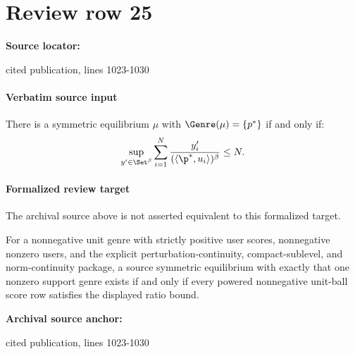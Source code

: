 \documentclass[10pt]{article}
\begin{document}
\section*{Review row 25}
\textbf{Source locator:} {\footnotesize\raggedright cited publication, lines 1023-\allowbreak{}1030\par}
\paragraph{Verbatim source input}
\begin{ReviewVerbatim}
\begin{lemma}
\label{lemma:optsingledirection}
There is a symmetric equilibrium $\mu$ with $\Genre(\mu) = \left\{p^*\right\}$ if and only if:
\begin{equation}
\label{eq:optsingle}
  \sup_{y' \in \Set^{\beta}} \sum_{i=1}^N  \frac{y'_i}{(\langle \p^*, u_i \rangle)^{\beta}} \le N.
\end{equation}
\end{lemma}
\end{ReviewVerbatim}


\paragraph{Formalized review target}
The archival source above is not asserted equivalent to this formalized target.
\begin{ReviewVerbatim}
For a nonnegative unit genre with strictly positive user scores, nonnegative nonzero users, and the explicit perturbation-continuity, compact-sublevel, and norm-continuity package, a source symmetric equilibrium with exactly that one nonzero support genre exists if and only if every powered nonnegative unit-ball score row satisfies the displayed ratio bound.
\end{ReviewVerbatim}

\textbf{Archival source anchor:} {\footnotesize\raggedright cited publication, lines 1023-\allowbreak{}1030\par}
\end{document}
